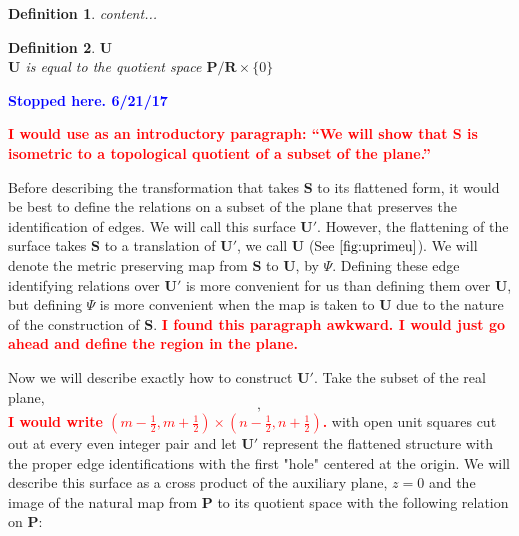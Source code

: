 \documentclass[]{article}
\newtheorem{Def}{Definition}[subsection]
\newcommand{\compav}[1]{\textbf{\textcolor{blue}{#1}}}
\newcommand{\compat}[1]{\textbf{\textcolor{red}{#1}}}
\begin{document}
\begin{Def}
content...
\end{Def}

\begin{Def}{$\mathbf U$}\\
$\mathbf U$ is equal to the quotient space $\mathbf{P}/\mathbf{R}\times\{0\}$
\end{Def}

\compav{Stopped here. 6/21/17}

\compat{I would use as an introductory paragraph: ``We will show that $\mathbf S$ is isometric to a topological quotient of a subset of the plane.''}

Before describing the transformation that takes $\mathbf{S}$ to its flattened form, it would be best to define the relations on a subset of the plane that preserves the identification of edges. We will call this surface $\mathbf{U}'$. However, the flattening of the surface takes $\mathbf{S}$ to a translation of $\mathbf{U}'$, we call $\mathbf{U}$ (See $\ref{fig:uprimeu}$). We will denote the metric preserving map from $\mathbf{S}$ to $\mathbf{U}$, by $\Psi$. Defining these edge identifying relations over $\mathbf{U}'$ is more convenient for us than defining them over $\mathbf{U}$, but defining $\Psi$ is more convenient when the map is taken to $\mathbf{U}$ due to the nature of the construction of $\mathbf{S}$. \compat{I found this paragraph awkward. I would just go ahead and define the region in the plane.}



Now we will describe exactly how to construct $\mathbf{U}'$. Take the subset of the real plane, 
$$,$$ 
\compat{I would write $(m-\frac{1}{2},m+\frac{1}{2}) \times (n-\frac{1}{2},n+\frac{1}{2})$.}
with open unit squares cut out at every even integer pair and let $\mathbf{U}'$ represent the flattened structure with the proper edge identifications with the first "hole" centered at the origin. We will describe this surface as a cross product of the auxiliary plane, $z=0$ and the image of the natural map from $\mathbf{P}$ to its quotient space with the following relation on $\mathbf{P}$:
\end{document}
